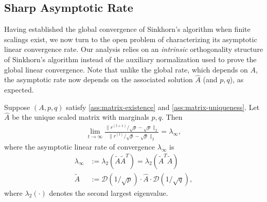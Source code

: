 
\subsection{Sharp Asymptotic Rate}
\label{subsec:sharp-rate}
Having established the global convergence of Sinkhorn's algorithm when finite scalings exist, we now turn to the open problem of characterizing its asymptotic linear convergence rate. Our analysis relies on an \emph{intrinsic} orthogonality structure of Sinkhorn's algorithm instead of the auxiliary  normalization used to prove the global linear convergence. Note that unlike the global rate, which depends on $A$, the asymptotic rate now depends on the associated solution $\hat A$ (and $p,q$), as expected. 
\begin{theorem}
\label{thm:convergence}
Suppose $(A,p,q)$ satisfy \cref{ass:matrix-existence} and \cref{ass:matrix-uniqueness}. Let $\hat{A}$
be the unique scaled matrix with marginals $p,q$. Then %
\begin{align*}
\lim_{t\rightarrow \infty} \frac{\|r^{(t+1)}/\sqrt{p}-\sqrt{p}\|_{2} }{\|r^{(t)}/\sqrt{p}-\sqrt{p}\|_{2}} = \lambda_\infty,
\end{align*}
where the asymptotic linear rate of convergence $\lambda_\infty$ is
\begin{align*}
\lambda_\infty & :=\lambda_{2}(\tilde{A}\tilde{A}^{T})=\lambda_{2}(\tilde{A}^{T}\tilde{A})\\
\tilde{A} & :=\mathcal{D}(1/\sqrt{p})\cdot\hat{A}\cdot\mathcal{D}(1/\sqrt{q}),
\end{align*}
where $\lambda_{2}(\cdot)$ denotes the second largest eigenvalue. 
\end{theorem}

